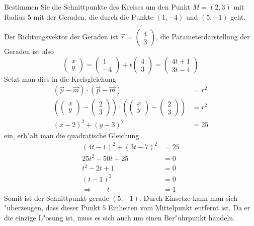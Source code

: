 Bestimmen Sie die Schnittpunkte des Kreises um den Punkt $M=(2,3)$
mit Radius $5$ mit der Geraden, die durch die Punkte $(1,-4)$
und $(5,-1)$ geht.

\begin{loesung}
Der Richtungsvektor der Geraden ist $\vec r=\begin{pmatrix}4\\3\end{pmatrix}$,
die Parameterdarstellung der Geraden ist also
\[
\begin{pmatrix}x\\y\end{pmatrix}
=
\begin{pmatrix}1\\-4\end{pmatrix}
+t
\begin{pmatrix}4\\3\end{pmatrix}
=
\begin{pmatrix}4t+1\\3t-4\end{pmatrix}
\]
Setzt man dies in die Kreisgleichung
\begin{align*}
(\vec p-\vec m)\cdot(\vec p-\vec m)&=r^2\\
\left(
\begin{pmatrix}x\\y\end{pmatrix}
-
\begin{pmatrix}2\\3\end{pmatrix}
\right)
\cdot
\left(
\begin{pmatrix}x\\y\end{pmatrix}
-
\begin{pmatrix}2\\3\end{pmatrix}
\right)
&=r^2
\\
(x-2)^2+(y-3)^2&=25
\end{align*}
ein, erh"alt man die quadratische Gleichung
\begin{align*}
(4t-1)^2+(3t-7)^2&=25
\\
25t^2-50t+25&=0
\\
t^2-2t+1&=0
\\
(t-1)^2&=0
\\
\Rightarrow\qquad t&=1
\end{align*}
Somit ist der Schnittpunkt gerade $(5,-1)$. Durch Einsetze kann
man sich "uberzeugen, dass dieser Punkt $5$ Einheiten vom Mittelpunkt
entfernt ist. Da er die einzige L"osung ist, muss es sich auch um
einen Ber"uhrpunkt handeln.
\end{loesung}

